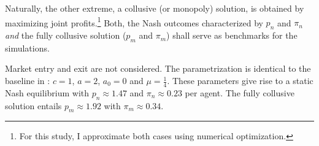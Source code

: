 Naturally, the other extreme, a collusive (or monopoly) solution, is obtained by maximizing joint profits.\footnote{For this study, I approximate both cases using numerical optimization.} Both, the Nash outcomes characterized by $p_n$ and $\pi_n$ \emph{and} the fully collusive solution ($p_m$ and $\pi_m$) shall serve as benchmarks for the simulations.

Market entry and exit are not considered. The parametrization is identical to the baseline in \textcite{calvano_artificial_2019}:
$c = 1$,
$a = 2$,
$a_0 = 0$ and
$\mu = \frac{1}{4}$. These parameters give rise to a static Nash equilibrium with $p_n \approx 1.47$ and $\pi_n \approx 0.23$ per agent. The fully collusive solution entails $p_m \approx 1.92$ with $\pi_m \approx 0.34$.
